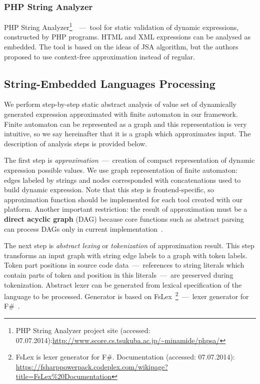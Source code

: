 \documentclass{acm_proc_article-sp}
\begin{document}
\subsubsection{PHP String Analyzer}

PHP String Analyzer\footnote{PHP String Analyzer project site (accessed: 07.07.2014):\url{http://www.score.cs.tsukuba.ac.jp/~minamide/phpsa/}}~\cite{Minamide}~---~tool for static validation of dynamic expressions, constructed by PHP programs. HTML and XML expressions can be analysed as embedded. The tool is based on the ideas of JSA algorithm, but the authors proposed to use context-free approximation instead of regular.

\subsection{String-Embedded Languages Processing}

We perform step-by-step static abstract analysis of value set of dynamically generated expression approximated with finite automaton in our framework. Finite automaton can be represented as a graph and this representation is very intuitive, so we say hereinafter that it is a graph which approximates input. The description of analysis steps is provided below. 

The first step is {\it approximation}~---~creation of compact representation of dynamic expression possible values. We use graph representation of finite automaton: edges labeled by strings and nodes corresponded with concatenations used to build dynamic expression. Note that this step is frontend-specific, so approximation function should be implemented for each tool created with our platform. Another important restriction: the result of approximation must be a {\bf direct acyclic graph} (DAG) because core functions such as abstract parsing can process DAGs only in current implementation~\cite{AGLR}.

The next step is {\it abstract lexing} or {\it tokenization} of approximation result. This step transforms an input graph with string edge labels to a graph with token labels. Token part positions in source code data~---~references to string literals which contain parts of token and position in this literals~---~are preserved during tokenization. Abstract lexer can be generated from lexical specification of the language to be processed. Generator is based on FsLex~\footnote{FsLex is lexer generator for F\#. Documentation (accessed: 07.07.2014): \url{https://fsharppowerpack.codeplex.com/wikipage?title=FsLex\%20Documentation}}~---~lexer generator for F\#~\cite{FS}. 
\end{document}
